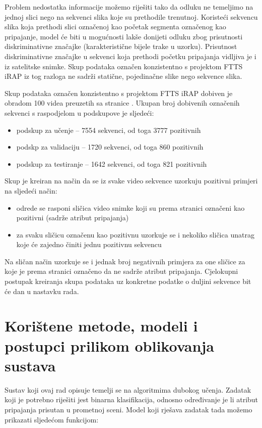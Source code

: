 \documentclass[times, utf8, diplomski, numeric]{fer}
\begin{document}
Problem nedostatka informacije možemo riješiti tako da odluku ne temeljimo na jednoj slici nego na sekvenci slika koje su prethodile trenutnoj. 
Koristeći sekvencu slika koja prethodi slici označenoj kao početak segmenta označenog kao pripajanje, model će biti u mogućnosti lakše donijeti odluku zbog prisutnosti diskriminativne značajke (karakteristične bijele trake u uzorku).
Prisutnost diskriminativne značajke u sekvenci koja prethodi početku pripajanja vidljiva je i iz satelitske snimke.
Skup podataka označen konzistentno s projektom FTTS iRAP iz tog razloga ne sadrži statične, pojedinačne slike nego sekvence slika.

Skup podataka označen konzistentno s projektom FTTS iRAP dobiven je obradom 100 videa preuzetih sa stranice \citep{url:ftts_irap}. 
Ukupan broj dobivenih označenih sekvenci s raspodjelom u podskupove je sljedeći:
\begin{itemize}
 \item podskup za učenje -- 7554 sekvenci, od toga 3777 pozitivnih
 \item podskp za validaciju -- 1720 sekvenci, od toga 860 pozitivnih
 \item podskup za testiranje -- 1642 sekvenci, od toga 821 pozitivnih
\end{itemize}

\noindent Skup je kreiran na način da se iz svake video sekvence uzorkuju pozitivni primjeri na sljedeći način: 
\begin{itemize}
 \item odrede se rasponi sličica video snimke koji su prema stranici \citep{url:ftts_irap} označeni kao pozitivni (sadrže atribut pripajanja)
 \item za svaku sličicu označenu kao pozitivnu uzorkuje se i nekoliko sličica unatrag koje će zajedno činiti jednu pozitivnu sekvencu
\end{itemize}

\noindent Na sličan način uzorkuje se i jednak broj negativnih primjera za one sličice za koje je prema stranici \citep{url:ftts_irap} označeno da ne sadrže atribut pripajanja.
Cjelokupni postupak kreiranja skupa podataka uz konkretne podatke o duljini sekvence bit će dan u nastavku rada.

\chapter{Korištene metode, modeli i postupci prilikom oblikovanja sustava}
Sustav koji ovaj rad opisuje temelji se na algoritmima dubokog učenja. 
Zadatak koji je potrebno riješiti jest binarna klasifikacija, odnosno određivanje je li atribut pripajanja prisutan u prometnoj sceni.
Model koji rješava zadatak tada možemo prikazati sljedećom funkcijom:
\end{document}
